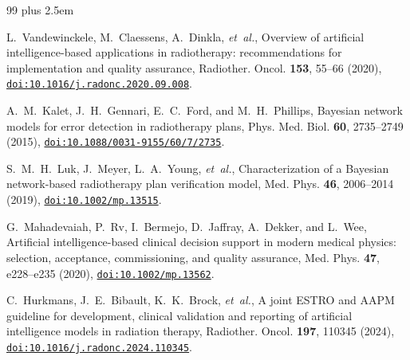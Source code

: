 \documentclass[aps,prx,reprint,superscriptaddress,nofootinbib]{revtex4-2}
\def\UrlBigBreaks{\do\/\do\.\do\_\do\:\do\;\do\,\do\?\do\&\do\=\do\#}
\begin{document}
\def\UrlBigBreaks{\do\/}
\def\UrlBreaks{\do\.\do\_\do\-\do\:\do\;\do\,\do\?\do\&\do\=\do\#}
\mathchardef{}\relax
\mathchardef{}\relax
\begin{thebibliography}{99}
\rightskip=0pt plus 2.5em\relax
{}\relax %

L.~Vandewinckele, M.~Claessens, A.~Dinkla, \textit{et~al.}, Overview of artificial
intelligence-based applications in radiotherapy: recommendations for implementation and quality
assurance, Radiother. Oncol. \textbf{153}, \mbox{55--66} (2020),
\href{https://doi.org/10.1016/j.radonc.2020.09.008}{\nolinkurl{doi:10.1016/j.radonc.2020.09.008}}.

A.~M.~Kalet, J.~H.~Gennari, E.~C.~Ford, and M.~H.~Phillips, Bayesian network models for error
detection in radiotherapy plans, Phys. Med. Biol. \textbf{60}, \mbox{2735--2749} (2015),
\href{https://doi.org/10.1088/0031-9155/60/7/2735}{\nolinkurl{doi:10.1088/0031-9155/60/7/2735}}.

S.~M.~H.~Luk, J.~Meyer, L.~A.~Young, \textit{et~al.}, Characterization of a Bayesian network-based
radiotherapy plan verification model, Med. Phys. \textbf{46}, \mbox{2006--2014} (2019),
\href{https://doi.org/10.1002/mp.13515}{\nolinkurl{doi:10.1002/mp.13515}}.

G.~Mahadevaiah, P.~Rv, I.~Bermejo, D.~Jaffray, A.~Dekker, and L.~Wee, Artificial intelligence-based
clinical decision support in modern medical physics: selection, acceptance, commissioning, and
quality assurance, Med. Phys. \textbf{47}, \mbox{e228--e235} (2020),
\href{https://doi.org/10.1002/mp.13562}{\nolinkurl{doi:10.1002/mp.13562}}.

C.~Hurkmans, J.~E.~Bibault, K.~K.~Brock, \textit{et~al.}, A joint ESTRO and AAPM guideline for
development, clinical validation and reporting of artificial intelligence models in radiation
therapy, Radiother. Oncol. \textbf{197}, \mbox{110345} (2024),
\href{https://doi.org/10.1016/j.radonc.2024.110345}{\nolinkurl{doi:10.1016/j.radonc.2024.110345}}.


\end{thebibliography}
\end{document}

